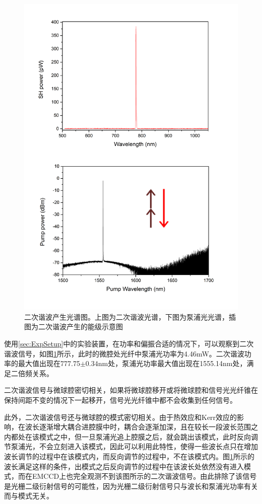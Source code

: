 \documentclass[UTF8,a4paper,cs4size,hyperref]{ctexart}
\begin{document}
\begin{figure}
\centering
\includegraphics[width=14cm ]{FigSHspectrum}
\caption{二次谐波产生光谱图。上图为二次谐波光谱，下图为泵浦光光谱，插图为二次谐波产生的能级示意图}
\label{pic:FigSHspectrum}
\end{figure}

使用\ref{sec:ExpSetup}中的实验装置，在功率和偏振合适的情况下，可以观察到二次谐波信号，如图\ref{pic:FigSHspectrum}所示，此时的微腔处光纤中泵浦光功率为4.46mW。二次谐波功率的最大值出现在777.75$\pm0.34$nm处，泵浦光功率最大值出现在1555.14nm处，满足二倍频关系。


二次谐波信号与微球腔密切相关，如果将微球腔移开或将微球腔和信号光光纤锥在保持间距不变的情况下一起移开，信号光光纤锥中都不会收集到任何信号。

此外，二次谐波信号还与微球腔的模式密切相关。由于热效应和Kerr效应的影响，在波长逐渐增大耦合进腔膜中时，耦合会逐渐加深，且在较长一段波长范围之内都处在该模式之中，但一旦泵浦光追上腔膜之后，就会跳出该模式，此时反向调节泵浦光，不会立刻进入该模式\cite{carmon2004dynamical}，因此可以利用此特性，使得一些波长点只在增加波长调节的过程中在该模式内，而反向调节的过程中，不在该模式内。图\ref{pic:FigSHspectrum}所示的波长满足这样的条件，出模式之后反向调节的过程中在该波长处依然没有进入模式，而在EMCCD上也完全观测不到该图所示的二次谐波信号。由此排除了该信号是光栅二级衍射信号的可能性，因为光栅二级衍射信号只与波长和泵浦光功率有关而与模式无关。
\end{document}
